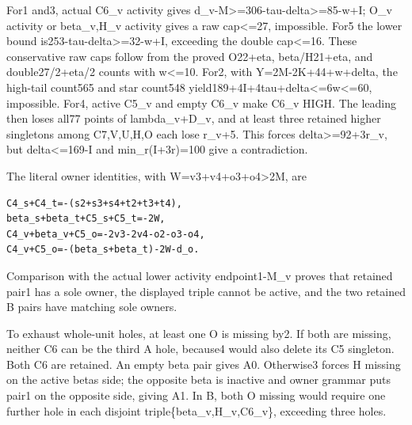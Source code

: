 \documentclass[10pt,a4paper]{article}
\theoremstyle{definition}
\begin{document}
For1 and3,\allowbreak{} actual C6\_\allowbreak{}v activity gives
d\_\allowbreak{}v-M\textgreater=\allowbreak{}306-tau-delta\textgreater=\allowbreak{}85-w+\allowbreak{}I; O\_\allowbreak{}v activity or
beta\_\allowbreak{}v,\allowbreak{}H\_\allowbreak{}v activity gives a raw cap\textless=\allowbreak{}27,\allowbreak{} impossible. For5 the
lower bound is253-tau-delta\textgreater=\allowbreak{}32-w+\allowbreak{}I,\allowbreak{} exceeding the double
cap\textless=\allowbreak{}16. These conservative raw caps follow from the proved
O22+\allowbreak{}eta,\allowbreak{} beta/H21+\allowbreak{}eta,\allowbreak{} and double27/2+\allowbreak{}eta/2 counts with w\textless=\allowbreak{}10.
For2,\allowbreak{} with Y=\allowbreak{}2M-2K+\allowbreak{}44+\allowbreak{}w+\allowbreak{}delta,\allowbreak{} the high-tail count565 and star count548
yield189+\allowbreak{}4I+\allowbreak{}4tau+\allowbreak{}delta\textless=\allowbreak{}6w\textless=\allowbreak{}60,\allowbreak{} impossible. For4,\allowbreak{} active
C5\_\allowbreak{}v and empty C6\_\allowbreak{}v make C6\_\allowbreak{}v HIGH. The leading then loses all77
points of lambda\_\allowbreak{}v+\allowbreak{}D\_\allowbreak{}v,\allowbreak{} and at least three retained higher singletons
among C7,\allowbreak{}V,\allowbreak{}U,\allowbreak{}H,\allowbreak{}O each lose r\_\allowbreak{}v+\allowbreak{}5. This forces
delta\textgreater=\allowbreak{}92+\allowbreak{}3r\_\allowbreak{}v,\allowbreak{} but delta\textless=\allowbreak{}169-I and
min\_\allowbreak{}r(I+\allowbreak{}3r)=\allowbreak{}100 give a contradiction.

The literal owner identities,\allowbreak{} with W=\allowbreak{}v3+\allowbreak{}v4+\allowbreak{}o3+\allowbreak{}o4\textgreater2M,\allowbreak{} are

\begin{lstlisting}
C4_s+C4_t=-(s2+s3+s4+t2+t3+t4),
beta_s+beta_t+C5_s+C5_t=-2W,
C4_v+beta_v+C5_o=-2v3-2v4-o2-o3-o4,
C4_v+C5_o=-(beta_s+beta_t)-2W-d_o.
\end{lstlisting}

Comparison with the actual lower activity endpoint1-M\_\allowbreak{}v proves that
retained pair1 has a sole owner,\allowbreak{} the displayed triple cannot be active,\allowbreak{}
and the two retained B pairs have matching sole owners.

To exhaust whole-unit holes,\allowbreak{} at least one O is missing by2. If both are
missing,\allowbreak{} neither C6 can be the third A hole,\allowbreak{} because4 would also delete
its C5 singleton. Both C6 are retained. An empty beta pair gives A0.
Otherwise3 forces H missing on the active beta\textquotesingle s side;
the opposite beta is inactive and owner grammar puts pair1 on the
opposite side,\allowbreak{} giving A1. In B,\allowbreak{} both O missing would require one further
hole in each disjoint triple\{beta\_\allowbreak{}v,\allowbreak{}H\_\allowbreak{}v,\allowbreak{}C6\_\allowbreak{}v\},\allowbreak{} exceeding three
holes.
\end{document}
